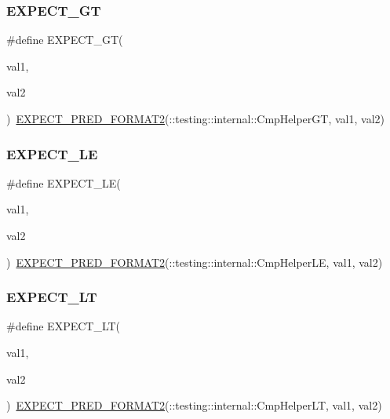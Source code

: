 \subsubsection{\texorpdfstring{EXPECT\_GT}{EXPECT\_GT}}
{\footnotesize\ttfamily \#define E\+X\+P\+E\+C\+T\+\_\+\+GT(\begin{DoxyParamCaption}\item[{}]{val1,  }\item[{}]{val2 }\end{DoxyParamCaption})~\mbox{\hyperlink{_obj__test_2lib_2googletest-release-1_88_81_2googletest_2include_2gtest_2gtest__pred__impl_8h_af0141918615a5e2d5247e9cda8324dae}{E\+X\+P\+E\+C\+T\+\_\+\+P\+R\+E\+D\+\_\+\+F\+O\+R\+M\+A\+T2}}(\+::testing\+::internal\+::\+Cmp\+Helper\+GT, val1, val2)}

\mbox{\label{_obj__test_2lib_2googletest-release-1_88_81_2googletest_2include_2gtest_2gtest_8h_ae0f265632323b4a07b585dcfde10f60a}} 
\subsubsection{\texorpdfstring{EXPECT\_LE}{EXPECT\_LE}}
{\footnotesize\ttfamily \#define E\+X\+P\+E\+C\+T\+\_\+\+LE(\begin{DoxyParamCaption}\item[{}]{val1,  }\item[{}]{val2 }\end{DoxyParamCaption})~\mbox{\hyperlink{_obj__test_2lib_2googletest-release-1_88_81_2googletest_2include_2gtest_2gtest__pred__impl_8h_af0141918615a5e2d5247e9cda8324dae}{E\+X\+P\+E\+C\+T\+\_\+\+P\+R\+E\+D\+\_\+\+F\+O\+R\+M\+A\+T2}}(\+::testing\+::internal\+::\+Cmp\+Helper\+LE, val1, val2)}

\mbox{\label{_obj__test_2lib_2googletest-release-1_88_81_2googletest_2include_2gtest_2gtest_8h_af28c06b2b5e8dee151896f299f6610cf}} 
\subsubsection{\texorpdfstring{EXPECT\_LT}{EXPECT\_LT}}
{\footnotesize\ttfamily \#define E\+X\+P\+E\+C\+T\+\_\+\+LT(\begin{DoxyParamCaption}\item[{}]{val1,  }\item[{}]{val2 }\end{DoxyParamCaption})~\mbox{\hyperlink{_obj__test_2lib_2googletest-release-1_88_81_2googletest_2include_2gtest_2gtest__pred__impl_8h_af0141918615a5e2d5247e9cda8324dae}{E\+X\+P\+E\+C\+T\+\_\+\+P\+R\+E\+D\+\_\+\+F\+O\+R\+M\+A\+T2}}(\+::testing\+::internal\+::\+Cmp\+Helper\+LT, val1, val2)}

